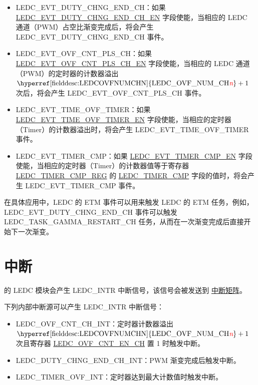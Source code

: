 \documentclass[main\_\_CN.tex]{subfiles}
\begin{document}
\begin{itemize}
    \item LEDC\_EVT\_DUTY\_CHNG\_END\_CH：如果 \hyperref[fielddesc:LEDCEVTDUTYCHNGENDCHNEN]{LEDC\_EVT\_DUTY\_CHNG\_END\_CH\_EN} 字段使能，当相应的 LEDC 通道（PWM）占空比渐变完成后，将会产生 LEDC\_EVT\_DUTY\_CHNG\_END\_CH 事件。
    \item LEDC\_EVT\_OVF\_CNT\_PLS\_CH：如果 \hyperref[fielddesc:LEDCEVTOVFCNTPLSCHNEN]{LEDC\_EVT\_OVF\_CNT\_PLS\_CH\_EN} 字段使能，当相应的 LEDC 通道（PWM）的定时器的计数器溢出$ \textrm{\hyperref[fielddesc:LEDCOVFNUMCHN]{LEDC\_OVF\_NUM\_CH\regindex{n}}} + 1 $ 次后，将会产生 LEDC\_EVT\_OVF\_CNT\_PLS\_CH 事件。
    \item LEDC\_EVT\_TIME\_OVF\_TIMER：如果 \hyperref[fielddesc:LEDCEVTTIMEOVFTIMERNEN]{LEDC\_EVT\_TIME\_OVF\_TIMER\_EN} 字段使能，当相应的定时器（Timer）的计数器溢出时，将会产生 LEDC\_EVT\_TIME\_OVF\_TIMER 事件。
    \item LEDC\_EVT\_TIMER\_CMP：如果 \hyperref[fielddesc:LEDCEVTTIMERNCMPEN]{LEDC\_EVT\_TIMER\_CMP\_EN} 字段使能，当相应的定时器（Timer）的计数器值等于寄存器 \hyperref[regdesc:LEDCTIMERNCMPREG]{LEDC\_TIMER\_CMP\_REG} 的 \hyperref[fielddesc:LEDCTIMERNCMP]{LEDC\_TIMER\_CMP} 字段的值时，将会产生 LEDC\_EVT\_TIMER\_CMP 事件。
\end{itemize}

在具体应用中，LEDC 的 ETM 事件可以用来触发 LEDC 的 ETM 任务，例如，LEDC\_EVT\_DUTY\_CHNG\_END\_CH 事件可以触发 LEDC\_TASK\_GAMMA\_RESTART\_CH 任务，从而在一次渐变完成后直接开始下一次渐变。

\section{中断}

\chipname{} 的 LEDC 模块会产生 LEDC\_INTR 中断信号，该信号会被发送到 \hyperref[mod:intmtrx]{中断矩阵}。

下列内部中断源可以产生 LEDC\_INTR 中断信号：

\begin{itemize}
\item \label{int:ledc-ovf-cnt}LEDC\_OVF\_CNT\_CH\_INT：定时器计数器溢出 $ \textrm{\hyperref[fielddesc:LEDCOVFNUMCHN]{LEDC\_OVF\_NUM\_CH\regindex{n}}} + 1 $ 次且寄存器 \hyperref[fielddesc:LEDCOVFCNTENCHN]{LEDC\_OVF\_CNT\_EN\_CH} 置 1 时触发中断。
\item \label{int:ledc-duty-chng-end}LEDC\_DUTY\_CHNG\_END\_CH\_INT：PWM 渐变完成后触发中断。
\item \label{int:ledc-timer-ovf}LEDC\_TIMER\_OVF\_INT：定时器达到最大计数值时触发中断。
\end{itemize}
\end{document}
